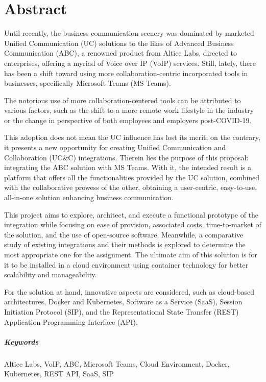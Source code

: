 \chapter*{Abstract}

Until recently, the business communication scenery was dominated by marketed Unified Communication (UC) solutions to the likes of Advanced Business Communication (ABC), a renowned product from Altice Labs, directed to enterprises, offering a myriad of Voice over IP (VoIP) services. Still, lately, there has been a shift toward using more collaboration-centric incorporated tools in businesses, specifically Microsoft Teams (MS Teams).

The notorious use of more collaboration-centered tools can be attributed to various factors, such as the shift to a more remote work lifestyle in the industry or the change in perspective of both employees and employers post-COVID-19.

This adoption does not mean the UC influence has lost its merit; on the contrary, it presents a new opportunity for creating Unified Communication and Collaboration (UC\&C) integrations. Therein lies the purpose of this proposal: integrating the ABC solution with MS Teams. With it, the intended result is a platform that offers all the functionalities provided by the UC solution, combined with the collaborative prowess of the other, obtaining a user-centric, easy-to-use, all-in-one solution enhancing business communication.

This project aims to explore, architect, and execute a functional prototype of the integration while focusing on ease of provision, associated costs, time-to-market of the solution, and the use of open-source software. Meanwhile, a comparative study of existing integrations and their methods is explored to determine the most appropriate one for the assignment. The ultimate aim of this solution is for it to be installed in a cloud environment using container technology for better scalability and manageability.

For the solution at hand, innovative aspects are considered, such as cloud-based architectures, Docker and Kubernetes, Software as a Service (SaaS), Session Initiation Protocol (SIP), and the Representational State Transfer (REST) Application Programming Interface (API).

\paragraph{Keywords} Altice Labs, VoIP, ABC, Microsoft Teams, Cloud Environment, Docker, Kubernetes, REST API, SaaS, SIP

